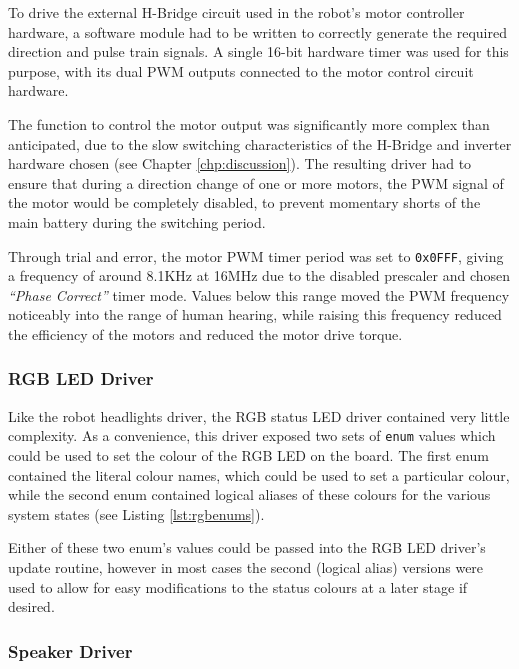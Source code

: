 To drive the external H-Bridge circuit used in the robot's motor controller hardware, a software module had to be written to correctly generate the required direction and pulse train signals. A single 16-bit hardware timer was used for this purpose, with its dual PWM outputs connected to the motor control circuit hardware.

The function to control the motor output was significantly more complex than anticipated, due to the slow switching characteristics of the H-Bridge and inverter hardware chosen (see Chapter \ref{chp:discussion}). The resulting driver had to ensure that during a direction change of one or more motors, the PWM signal of the motor would be completely disabled, to prevent momentary shorts of the main battery during the switching period.

Through trial and error, the motor PWM timer period was set to \lstinline{0x0FFF}, giving a frequency of around 8.1KHz at 16MHz due to the disabled prescaler and chosen \textit{``Phase Correct''} timer mode. Values below this range moved the PWM frequency noticeably into the range of human hearing, while raising this frequency reduced the efficiency of the motors and reduced the motor drive torque.

\FloatBarrier
\subsubsection{RGB LED Driver}

Like the robot headlights driver, the RGB status LED driver contained very little complexity. As a convenience, this driver exposed two sets of \lstinline{enum} values which could be used to set the colour of the RGB LED on the board. The first enum contained the literal colour names, which could be used to set a particular colour, while the second enum contained logical aliases of these colours for the various system states (see Listing \ref{lst:rgbenums}).



Either of these two enum's values could be passed into the RGB LED driver's update routine, however in most cases the second (logical alias) versions were used to allow for easy modifications to the status colours at a later stage if desired.

\FloatBarrier
\subsubsection{Speaker Driver}

